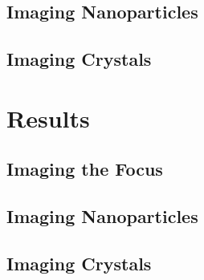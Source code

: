 \subsection{Imaging Nanoparticles}
\subsection{Imaging Crystals}

\section{Results}
\subsection{Imaging the Focus}
\subsection{Imaging Nanoparticles}
\subsection{Imaging Crystals}

